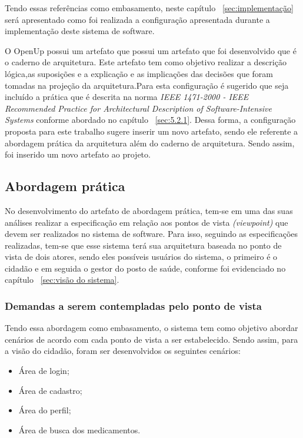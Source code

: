 Tendo essas referências como embasamento, neste capítulo ~\ref{sec:implementação} será apresentado como foi realizada a configuração apresentada durante a implementação deste sistema de software.

O \acrfull{OpenUp} possui um artefato que possui um artefato que foi desenvolvido que é o caderno de arquitetura. Este artefato tem como objetivo realizar a descrição lógica,as suposições e a explicação e as implicações das decisões que foram tomadas na projeção da arquitetura\cite{openup}.Para esta configuração é sugerido que seja incluído a prática que é descrita na norma \emph{IEEE 1471-2000 - IEEE Recommended Practice for Architectural Description of Software-Intensive Systems} conforme abordado no capítulo ~\ref{sec:5.2.1}. Dessa forma, a configuração proposta para este trabalho sugere inserir um novo artefato, sendo ele referente a abordagem prática da arquitetura além do caderno de arquitetura. Sendo assim, foi inserido um novo artefato ao projeto.

\subsection{Abordagem prática}
No desenvolvimento do artefato de abordagem prática, tem-se em uma das suas análises realizar a especificação em relação aos pontos de vista \emph{(viewpoint)} que devem ser realizados no sistema de software. Para isso, seguindo as especificações realizadas, tem-se que esse sistema terá sua arquitetura baseada no ponto de vista de dois atores, sendo eles possíveis usuários do sistema, o primeiro é o cidadão e em seguida o gestor do posto de saúde, conforme foi evidenciado no capítulo  ~\ref{sec:visão do sistema}.

\subsubsection{Demandas a serem contempladas pelo ponto de vista}

Tendo essa abordagem como embasamento, o sistema tem como objetivo abordar cenários de acordo com cada ponto de vista a ser estabelecido. Sendo assim, para a visão do cidadão, foram ser desenvolvidos os seguintes cenários:
\begin{itemize}
    \item Área de login;
    \item Área de cadastro;
    \item Área do perfil;
    \item Área de busca dos medicamentos.
\end{itemize}

